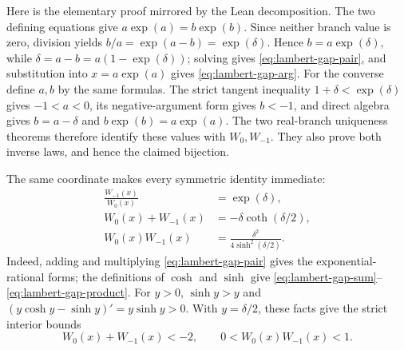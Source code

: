 \documentclass[11pt,oneside]{article}
\theoremstyle{definition}
\theoremstyle{remark}
\begin{document}
Here is the elementary proof mirrored by the Lean decomposition.  The two
defining equations give \(a\exp(a)=b\exp(b)\).  Since neither branch value is
zero, division yields \(b/a=\exp(a-b)=\exp(\delta)\).  Hence
\(b=a\exp(\delta)\), while
\(\delta=a-b=a(1-\exp(\delta))\); solving gives
\eqref{eq:lambert-gap-pair}, and substitution into \(x=a\exp(a)\) gives
\eqref{eq:lambert-gap-arg}.  For the converse define \(a,b\) by the same
formulas.  The strict tangent inequality
\(1+\delta<\exp(\delta)\) gives \(-1<a<0\), its negative-argument form gives
\(b<-1\), and direct algebra gives \(b=a-\delta\) and
\(b\exp(b)=a\exp(a)\).  The two real-branch uniqueness theorems therefore
identify these values with \(W_0,W_{-1}\).  They also prove both inverse laws,
and hence the claimed bijection.

The same coordinate makes every symmetric identity immediate:
\begin{align}
 \frac{W_{-1}(x)}{W_0(x)}&=\exp(\delta),                  \label{eq:lambert-gap-ratio}\\
 W_0(x)+W_{-1}(x)&=-\delta\coth(\delta/2),               \label{eq:lambert-gap-sum}\\
 W_0(x)W_{-1}(x)&=\frac{\delta^2}{4\sinh^2(\delta/2)}.  \label{eq:lambert-gap-product}
\end{align}
Indeed, adding and multiplying \eqref{eq:lambert-gap-pair} gives the
exponential-rational forms; the definitions of \(\cosh\) and \(\sinh\)
give \eqref{eq:lambert-gap-sum}--\eqref{eq:lambert-gap-product}.  For
\(y>0\), \(\sinh y>y\) and
\((y\cosh y-\sinh y)'=y\sinh y>0\).  With \(y=\delta/2\), these facts give
the strict interior bounds
\begin{equation}
 W_0(x)+W_{-1}(x)<-2,
 \qquad 0<W_0(x)W_{-1}(x)<1.                              \label{eq:lambert-gap-strict}
\end{equation}
\end{document}
